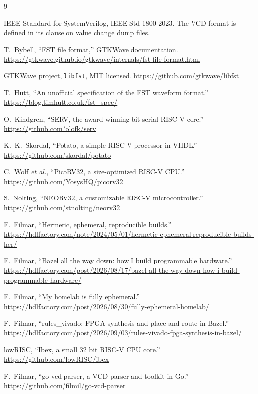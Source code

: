 \documentclass[conference]{IEEEtran}
\begin{document}
\begin{thebibliography}{9}

IEEE Standard for SystemVerilog, IEEE Std 1800-2023. The VCD format is
defined in its clause on value change dump files.

T.~Bybell, ``FST file format,'' GTKWave documentation.
\url{https://gtkwave.github.io/gtkwave/internals/fst-file-format.html}

GTKWave project, \texttt{libfst}, MIT licensed.
\url{https://github.com/gtkwave/libfst}

T.~Hutt, ``An unofficial specification of the FST waveform format.''
\url{https://blog.timhutt.co.uk/fst_spec/}

O.~Kindgren, ``SERV, the award-winning bit-serial RISC-V core.''
\url{https://github.com/olofk/serv}

K.~K.~Skordal, ``Potato, a simple RISC-V processor in VHDL.''
\url{https://github.com/skordal/potato}

C.~Wolf \emph{et al.}, ``PicoRV32, a size-optimized RISC-V CPU.''
\url{https://github.com/YosysHQ/picorv32}

S.~Nolting, ``NEORV32, a customizable RISC-V microcontroller.''
\url{https://github.com/stnolting/neorv32}

F.~Filmar, ``Hermetic, ephemeral, reproducible builds.''
\url{https://hdlfactory.com/note/2024/05/01/hermetic-ephemeral-reproducible-builds-her/}

F.~Filmar, ``Bazel all the way down: how I build programmable
hardware.''
\url{https://hdlfactory.com/post/2026/08/17/bazel-all-the-way-down-how-i-build-programmable-hardware/}

F.~Filmar, ``My homelab is fully ephemeral.''
\url{https://hdlfactory.com/post/2026/08/30/fully-ephemeral-homelab/}

F.~Filmar, ``rules\_vivado: FPGA synthesis and place-and-route in
Bazel.''
\url{https://hdlfactory.com/post/2026/09/03/rules-vivado-fpga-synthesis-in-bazel/}

lowRISC, ``Ibex, a small 32 bit RISC-V CPU core.''
\url{https://github.com/lowRISC/ibex}

F.~Filmar, ``go-vcd-parser, a VCD parser and toolkit in Go.''
\url{https://github.com/filmil/go-vcd-parser}

\end{thebibliography}
\end{document}
